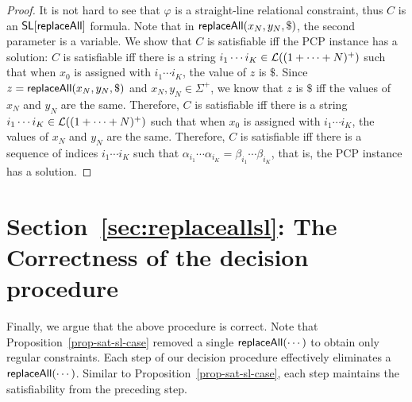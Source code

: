 \begin{proof}
	It is not hard to see that $\varphi$ is a straight-line relational constraint, thus $C$ is an $\mathsf{SL}[\mathsf{replaceAll}]$ formula. Note that in $\mathsf{replaceAll}(x_N, y_N, \$)$, the second parameter is a variable. We show that $C$ is satisfiable iff the PCP instance has a solution: $C$ is satisfiable iff there is a string $i_1 \cdots i_K \in \mathcal{L}((1 + \cdots + N)^+)$ such that when $x_0$ is assigned with $i_1 \cdots i_K$, the value of $z$ is $\$$.
	Since $z = \mathsf{replaceAll}(x_N, y_N, \$)$ and $x_N, y_N \in \Sigma^+$, we know that $z$ is $\$$ iff the values of $x_N$ and $y_N$ are the same. Therefore, $C$ is satisfiable iff there is a string $i_1 \cdots i_K \in \mathcal{L}((1 + \cdots + N)^+)$ such that when $x_0$ is assigned with $i_1 \cdots i_K$, the values of $x_N$ and $y_N$ are the same. Therefore, $C$ is satisfiable iff there is a sequence of indices $i_1 \cdots i_K$ such that $\alpha_{i_1} \cdots \alpha_{i_K} = \beta_{i_1} \cdots \beta_{i_K}$, that is, the PCP instance has a solution.
\end{proof}


\section{Section~\ref{sec:replaceallsl}: The Correctness of the decision procedure}

Finally, we argue that the above procedure is correct.
Note that Proposition~\ref{prop-sat-sl-case} removed a single $\mathsf{replaceAll}(\cdots)$ to obtain only regular constraints.
Each step of our decision procedure effectively eliminates a $\mathsf{replaceAll}(\cdots)$.
Similar to Proposition~\ref{prop-sat-sl-case}, each step maintains the satisfiability from the preceding step.

